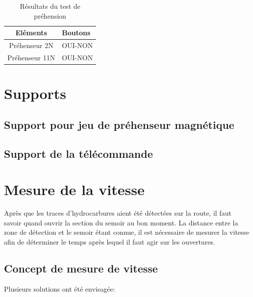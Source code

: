 \begin{table}[h]
    \begin{center}
        \caption{Résultats du test de préhension}
        \begin{tabular}{|c|l|}
            Eléments       & Boutons \\ \hline
            Préhenseur 2N  & OUI-NON \\
            Préhenseur 11N & OUI-NON \\
        \end{tabular}
    \end{center}
\end{table}

\section{Supports}

\subsection{Support pour jeu de préhenseur magnétique}
\subsection{Support de la télécommande}

\section{Mesure de la vitesse}
Après que les traces d'hydrocarbures aient été détectées sur la route, il faut savoir quand ouvrir la section du semoir au bon moment. La distance entre la zone de détection et le semoir étant connue,
il est nécessaire de mesurer la vitesse afin de déterminer le temps après lequel il faut agir sur les ouvertures.
\subsection{Concept de mesure de vitesse}
Plusieurs solutions ont été envisagée:

